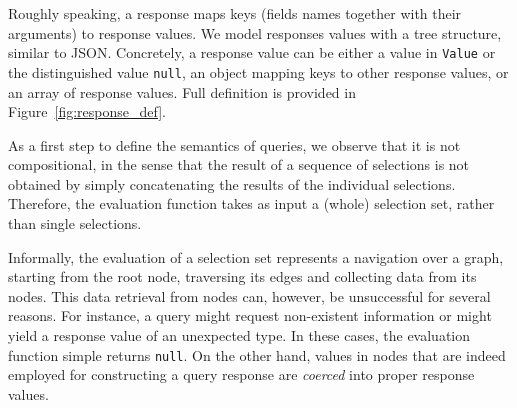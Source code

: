 Roughly speaking, a \gql response maps keys (fields names together
with their arguments) to response
values. We model responses values with a tree structure, similar to
JSON. Concretely, a response value can be either a value in
\texttt{Value} or the distinguished value \texttt{null}, an object
mapping keys to other response values, or an array of response
values. Full definition is provided in Figure~\ref{fig:response_def}.


%











As a first step to define the semantics of queries, we observe that it
is not compositional, in the sense that the result of a sequence of
selections is not obtained by simply concatenating the results of the
individual selections. Therefore, the evaluation function takes as
input a (whole) selection set, rather than single selections. 

Informally, the evaluation of a selection set represents a navigation
over a graph, starting from the root node, traversing its edges and
collecting data from its nodes. This data retrieval from nodes can,
however, be unsuccessful for several reasons. For instance, a query
might request non-existent information or might yield a response value
of an unexpected type. 
In these cases, the evaluation function simple returns
\texttt{null}. On the other hand, values in nodes that are indeed
employed for constructing a query response are \emph{coerced} into
proper response values.

